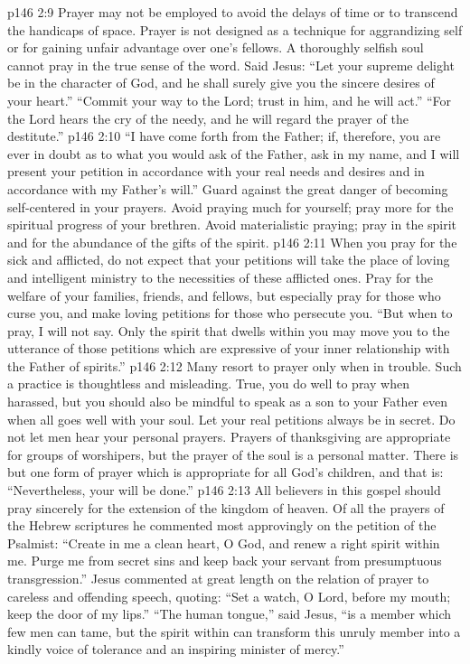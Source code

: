 \vs p146 2:9 \pc {}\bibnobreakspace Prayer may not be employed to avoid the delays of time or to transcend the handicaps of space. Prayer is not designed as a technique for aggrandizing self or for gaining unfair advantage over one’s fellows. A thoroughly selfish soul cannot pray in the true sense of the word. Said Jesus: \textcolor{ubdarkred}{“Let your supreme delight be in the character of God, and he shall surely give you the sincere desires of your heart.” “Commit your way to the Lord; trust in him, and he will act.” “For the Lord hears the cry of the needy, and he will regard the prayer of the destitute.”}
\vs p146 2:10 \pc {}\bibnobreakspace \textcolor{ubdarkred}{“I have come forth from the Father; if, therefore, you are ever in doubt as to what you would ask of the Father, ask in my name, and I will present your petition in accordance with your real needs and desires and in accordance with my Father’s will.”} Guard against the great danger of becoming self\hyp{}centered in your prayers. Avoid praying much for yourself; pray more for the spiritual progress of your brethren. Avoid materialistic praying; pray in the spirit and for the abundance of the gifts of the spirit.
\vs p146 2:11 \pc {}\bibnobreakspace When you pray for the sick and afflicted, do not expect that your petitions will take the place of loving and intelligent ministry to the necessities of these afflicted ones. Pray for the welfare of your families, friends, and fellows, but especially pray for those who curse you, and make loving petitions for those who persecute you. \textcolor{ubdarkred}{“But when to pray, I will not say. Only the spirit that dwells within you may move you to the utterance of those petitions which are expressive of your inner relationship with the Father of spirits.”}
\vs p146 2:12 \pc {}\bibnobreakspace Many resort to prayer only when in trouble. Such a practice is thoughtless and misleading. True, you do well to pray when harassed, but you should also be mindful to speak as a son to your Father even when all goes well with your soul. Let your real petitions always be in secret. Do not let men hear your personal prayers. Prayers of thanksgiving are appropriate for groups of worshipers, but the prayer of the soul is a personal matter. There is but one form of prayer which is appropriate for all God’s children, and that is: \textcolor{ubdarkred}{“Nevertheless, your will be done.”}
\vs p146 2:13 \pc {}\bibnobreakspace All believers in this gospel should pray sincerely for the extension of the kingdom of heaven. Of all the prayers of the Hebrew scriptures he commented most approvingly on the petition of the Psalmist: “Create in me a clean heart, O God, and renew a right spirit within me. Purge me from secret sins and keep back your servant from presumptuous transgression.” Jesus commented at great length on the relation of prayer to careless and offending speech, quoting: \textcolor{ubdarkred}{“Set a watch, O Lord, before my mouth; keep the door of my lips.” “The human tongue,”} said Jesus, \textcolor{ubdarkred}{“is a member which few men can tame, but the spirit within can transform this unruly member into a kindly voice of tolerance and an inspiring minister of mercy.”}
